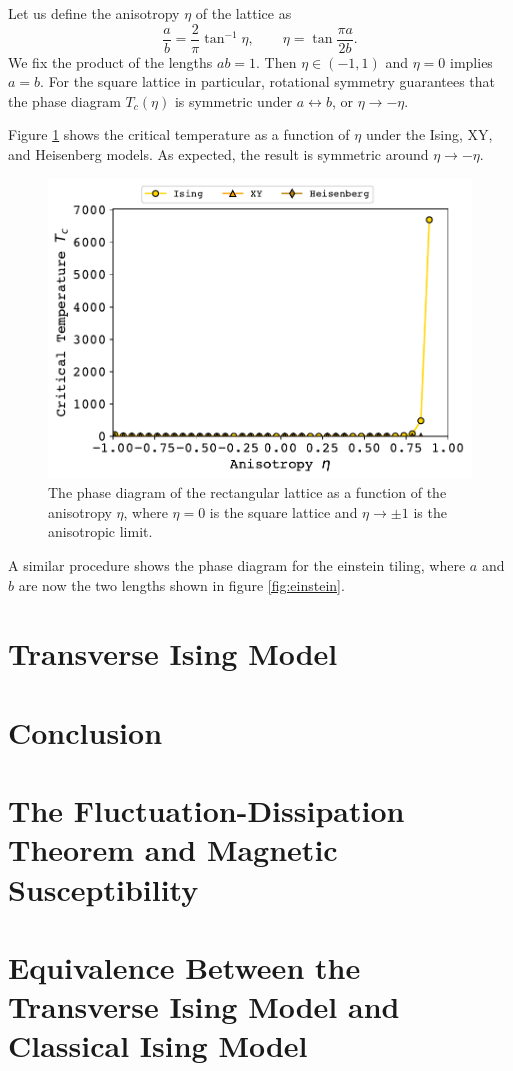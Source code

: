 \documentclass[amsmath,amssymb,aps,twocolumn,nofootinbib]{revtex4-2}
\begin{document}
Let us define the anisotropy $\eta$ of the lattice as 
\begin{equation}
  \frac{a}{b} = \frac{2}{\pi}\tan^{-1}\eta,\qquad \eta = \tan\frac{\pi a}{2b}.
\end{equation}
We fix the product of the lengths $ab=1$. Then $\eta \in (-1,1)$ and $\eta=0$ implies $a=b$. For the square lattice in particular, rotational symmetry guarantees that the phase diagram $T_c(\eta)$ is symmetric under $a\leftrightarrow b$, or $\eta \rightarrow -\eta$.

Figure \ref{fig:rect} shows the critical temperature as a function of $\eta$ under the Ising, XY, and Heisenberg models. As expected, the result is symmetric around $\eta \rightarrow -\eta$.

\begin{figure}
  \centering
  \includegraphics[width=\linewidth]{../figs/rect-phase.pdf}
  \caption{The phase diagram of the rectangular lattice as a function of the anisotropy $\eta$, where $\eta = 0$ is the square lattice and $\eta\rightarrow \pm 1$ is the anisotropic limit.}
  \label{fig:rect}
\end{figure}

A similar procedure shows the phase diagram for the einstein tiling, where $a$ and $b$ are now the two lengths shown in figure \ref{fig:einstein}.

\section{Transverse Ising Model}
\label{sec:tim}

\section{Conclusion}
\label{sec:conclusion}

\appendix

\section{The Fluctuation-Dissipation Theorem and Magnetic Susceptibility}
\label{app:fluctuation-dissipation}


\section{Equivalence Between the Transverse Ising Model and Classical Ising Model}
\label{app:tim-equivalence}


\end{document}
